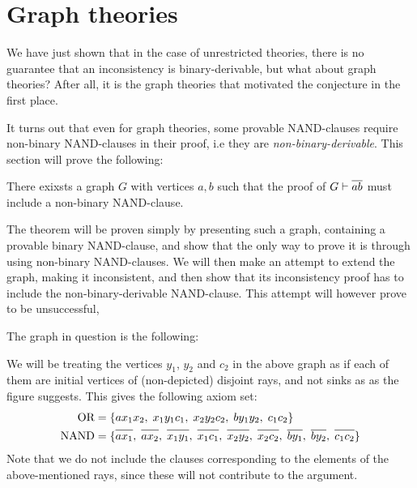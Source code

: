 \section{Graph theories}
\label{sec:Graph theories}
We have just shown that in the case of unrestricted theories, there is no guarantee that an inconsistency is binary-derivable, but what about graph theories?
After all, it is the graph theories that motivated the conjecture in the first place.

It turns out that even for graph theories, some provable NAND-clauses require non-binary NAND-clauses in their proof, i.e they are \textit{non-binary-derivable}.
This section will prove the following:
\begin{theorem}
  There exixsts a graph $G$ with vertices $a,b$ such that the proof of $G \vdash \ol{ab}$ must include a non-binary NAND-clause.
\end{theorem}
The theorem will be proven simply by presenting such a graph, containing a provable binary NAND-clause, and show that the only way to prove it is through using non-binary NAND-clauses.
We will then make an attempt to extend the graph, making it inconsistent, and then show that its inconsistency proof has to include the non-binary-derivable NAND-clause.
This attempt will however prove to be unsuccessful,

The graph in question is the following:\par
\begin{figure}[!h]
  \centering
  \caption{}
  \label{fig:open_door}
\end{figure}
We will be treating the vertices $y_1$, $y_2$ and $c_2$ in the above graph as if each of them are initial vertices of (non-depicted) disjoint rays, and not sinks as as the figure suggests.
This gives the following axiom set:
\begin{align}
  \text{OR} &= \{ ax_1x_2,\; x_1y_1c_1,\; x_2y_2c_2,\; by_1y_2,\; c_1c_2 \}\\
  \text{NAND} &= \{ \ol{ax_1},\; \ol{ax_2},\; \ol{x_1y_1},\; \ol{x_1c_1},\; \ol{x_2y_2},\; \ol{x_2c_2},\; \ol{by_1},\; \ol{by_2},\; \ol{c_1c_2} \}
\end{align}
Note that we do not include the clauses corresponding to the elements of the above-mentioned rays, since these will not contribute to the argument.

